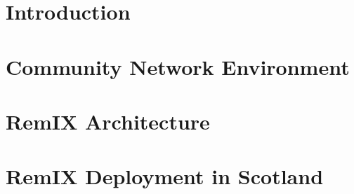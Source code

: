 \documentclass{sig-alternate-10pt}
\begin{document}
\begin{abstract}
\begin{comment}
Rural access networks are designed to bridge the `last-mile' broadband
gap in regions that are under-served by traditional broadband
providers. Their construction is bespoke, driven by their
beneficiaries, and determined by physical landscape, population
distribution, and monetary budget. Irrespective of their differences,
they are joined by one substantial challenge: connecting to the rest
of the Internet is prohibitively expensive. HUBS \textsc{c.i.c} was
created in Scotland to respond to this. It is a co-operative of access
network members that generates the economies of scale required to
afford backhaul and Internet transit. While intermediation at the IP
layer between the members and the Internet is required for reasons of
scale, it is neither necessary nor desirable amongst the member
networks themselves. In urban areas, networks could interconnect with
each other at an Internet Exchange Point (IXP). In Scotland where the
networks are scattered across 80,000km$^2$ of mountain, field, and sea
it is not so easy. We bridge this gap with a design for a distributed
Internet exchange for access networks in remote places. Doing so
allows for bilateral arrangements for mutual support and assistance
between these networks, and increases the resilience of access network
connectivity. We present the relevant components, and describe our
implementation, so that our efforts may be reproduced.
\end{comment} %
\end{abstract}


%
%

\section{Introduction} \label{sec:intro} 

\section{Community Network Environment} \label{sec:context} 

\section{RemIX Architecture} \label{sec:arch} 

\section{RemIX Deployment in Scotland} \label{sec:impl} 
\end{document}
